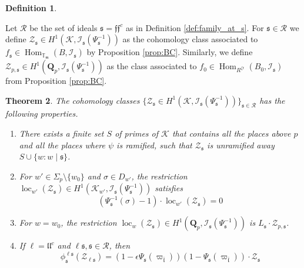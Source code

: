 \documentclass[leqno]{amsart}
\newtheorem{thm}{Theorem}[section]
\theoremstyle{definition}
\newtheorem{defn}[thm]{Definition}
\theoremstyle{remark}
\newcommand{\Qp}{\mathbf{Q}_p}
\DeclareMathOperator{\Hom}{Hom}
\newcommand{\ff}{\mathfrak{f}}
\newcommand{\fl}{\mathfrak{l}}
\newcommand{\fm}{\mathfrak{m}}
\newcommand{\fs}{\mathfrak{s}}
\newcommand{\K}{{\mathcal{K}}} %
\newcommand{\TT}{\mathbb{T}} %
\newcommand{\I}{\mathcal{I}} %
\DeclareMathOperator{\loc}{loc}
\begin{document}
\begin{defn}\label{def:bigEuler}

Let $\mathcal{R}$ be the set of ideals
$\fs=\ff\ff^c$ as in Definition \ref{def:family_at_s}.
For $\fs\in\mathcal{R}$ we define
$\mathcal{Z}_\fs\in H^1(\K,\I_\fs(\Psi_\fs^{-1}))$
as the cohomology class
associated to $f_\fs\in \Hom_{\TT_\fm}(B,\I_\fs)$
by Proposition \ref{prop:BC}.
Similarly, we define 
$\mathcal{Z}_{p,\fs}\in H^1(\Qp,\I_\fs(\Psi_\fs^{-1}))$
as the class associated to 
$f_0\in \Hom_{R^{\zeta\epsilon}}(B_0,\I_\fs)$
from Proposition \ref{prop:BC}.


\end{defn}


\begin{thm}\label{thm:Bigeu}
The cohomology classes
$\{\mathcal{Z}_\fs\in H^1(\K, \I_\fs(\Psi_\fs^{-1}))\}_{\fs\in\mathcal{R}}$
has the following properties.
\begin{enumerate}
    \item There exists a finite set $S$ of primes of $\K$
    that contains all the places above $p$ and all the 
    places where $\psi$ is ramified, such that 
    $\mathcal{Z}_{\fs}$ is unramified away 
    $S\cup \{w\colon w\mid \fs\}$.
    \item For $w'\in \Sigma_p\setminus\{w_0\}$
    and $\sigma\in D_{w'}$, the restriction
    $\loc_{w'}(\mathcal{Z}_\fs)\in H^1(\K_{w'}, \I_\fs(\Psi_\fs^{-1}))$
    satisfies 
    \[
        (\Psi_{\fs}^{-1}(\sigma)-1)\cdot \loc_{w'}(\mathcal{Z}_\fs)=0
    \]
    \item For $w=w_0$, the restriction 
    $\loc_{w}(\mathcal{Z}_\fs)\in H^1(\Qp, \I_\fs(\Psi_\fs^{-1}))$
    is $L_\fs\cdot \mathcal{Z}_{p,\fs}$.
    \item If $\ell=\fl\fl^c$ and $\ell\fs,\fs\in \mathcal{R}$, then
    \[
        \phi^{\ell\fs}_\fs(\mathcal{Z}_{\ell\fs})=
        (1-\epsilon\Psi_{\fs}(\varpi_{\bar{\fl}}))
        (1-\Psi_\fs(\varpi_{\bar{\fl}}))\cdot 
        \mathcal{Z}_{\fs}
    \]
\end{enumerate}
\end{thm}
\end{document}
